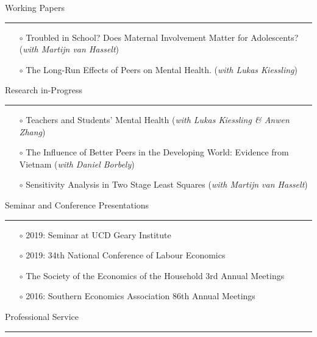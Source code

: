 \documentclass[12pt,a4paper]{article}
\begin{document}
	\bigskip 
	
	\noindent \textsf{{\large Working Papers}}  \vspace{0.1cm} \hrule \vspace{0.2cm}  

		\begin{itemize}
		\item[$\circ$] Troubled in School? Does Maternal Involvement Matter for Adolescents? (\textit{with Martijn van Hasselt})
		\item[$\circ$] The Long-Run Effects of Peers on Mental Health. (\textit{with Lukas Kiessling})
		\end{itemize}
		
	\bigskip

	\noindent \textsf{{\large Research in-Progress}}  \vspace{0.1cm} \hrule \vspace{0.2cm}  

		\begin{itemize}
		\item[$\circ$] Teachers and Students' Mental Health (\textit{with Lukas Kiessling \& Anwen Zhang})
		\item[$\circ$] The Influence of Better Peers in the Developing World: Evidence from Vietnam (\textit{with Daniel Borbely})
		\item[$\circ$] Sensitivity Analysis in Two Stage Least Squares (\textit{with Martijn van Hasselt}) 	
		\end{itemize}

		\bigskip
		
	\noindent \textsf{{\large Seminar and Conference Presentations}}  \vspace{0.1cm} \hrule \vspace{0.2cm}		

		\begin{itemize}
		\item[$\circ$] 2019: Seminar at UCD Geary Institute
		\item[$\circ$] 2019: 34th National Conference of Labour Economics
		\item[$\circ$] The Society of the Economics of the Household 3rd Annual Meetings
		\item[$\circ$] 2016: Southern Economics Association 86th Annual Meetings 
		\end{itemize}

	\bigskip
	
	\noindent \textsf{{\large Professional Service}}	 \vspace{0.1cm} \hrule \vspace{0.2cm}	
\end{document}
